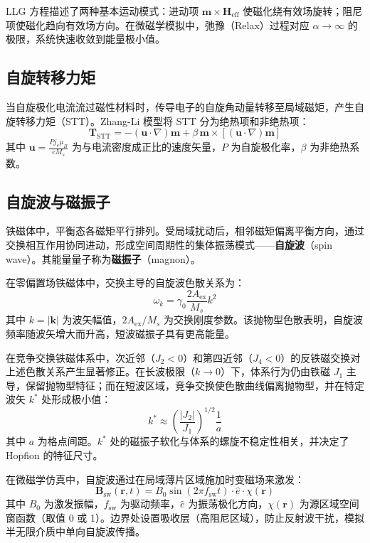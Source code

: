 LLG 方程描述了两种基本运动模式：进动项 $\mathbf{m} \times \mathbf{H}_{\text{eff}}$ 使磁化绕有效场旋转；阻尼项使磁化趋向有效场方向。在微磁学模拟中，弛豫（Relax）过程对应 $\alpha \to \infty$ 的极限，系统快速收敛到能量极小值。

\subsection{自旋转移力矩}

当自旋极化电流流过磁性材料时，传导电子的自旋角动量转移至局域磁矩，产生自旋转移力矩（STT）。Zhang-Li 模型将 STT 分为绝热项和非绝热项：
\begin{equation}
  \mathbf{T}_{\text{STT}} = -(\mathbf{u} \cdot \nabla)\mathbf{m} + \beta \, \mathbf{m} \times [(\mathbf{u} \cdot \nabla)\mathbf{m}]
  \label{eq:stt}
\end{equation}
其中 $\mathbf{u} = \frac{P j_e \mu_B}{e M_s}$ 为与电流密度成正比的速度矢量，$P$ 为自旋极化率，$\beta$ 为非绝热系数。


\subsection{自旋波与磁振子}

铁磁体中，平衡态各磁矩平行排列。受局域扰动后，相邻磁矩偏离平衡方向，通过交换相互作用协同进动，形成空间周期性的集体振荡模式——\textbf{自旋波}（spin wave）。其能量量子称为\textbf{磁振子}（magnon）。

在零偏置场铁磁体中，交换主导的自旋波色散关系为：
\begin{equation}
  \omega_k = \gamma_0 \frac{2A_{\text{ex}}}{M_s} k^2
  \label{eq:sw-dispersion}
\end{equation}
其中 $k = |\mathbf{k}|$ 为波矢幅值，$2A_{\text{ex}}/M_s$ 为交换刚度参数。该抛物型色散表明，自旋波频率随波矢增大而升高，短波磁振子具有更高能量。

在竞争交换铁磁体系中，次近邻（$J_2 < 0$）和第四近邻（$J_4 < 0$）的反铁磁交换对上述色散关系产生显著修正。在长波极限（$k \to 0$）下，体系行为仍由铁磁 $J_1$ 主导，保留抛物型特征；而在短波区域，竞争交换使色散曲线偏离抛物型，并在特定波矢 $k^*$ 处形成极小值：
\begin{equation}
  k^* \approx \left(\frac{|J_2|}{J_1}\right)^{1/2} \frac{1}{a}
  \label{eq:sw-kstar}
\end{equation}
其中 $a$ 为格点间距。$k^*$ 处的磁振子软化与体系的螺旋不稳定性相关，并决定了 Hopfion 的特征尺寸。

在微磁学仿真中，自旋波通过在局域薄片区域施加时变磁场来激发：
\begin{equation}
  \mathbf{B}_{\text{sw}}(\mathbf{r}, t) = B_0 \sin(2\pi f_{\text{sw}} t) \cdot \hat{e} \cdot \chi(\mathbf{r})
  \label{eq:sw-excitation}
\end{equation}
其中 $B_0$ 为激发振幅，$f_{\text{sw}}$ 为驱动频率，$\hat{e}$ 为振荡极化方向，$\chi(\mathbf{r})$ 为源区域空间窗函数（取值 0 或 1）。边界处设置吸收层（高阻尼区域），防止反射波干扰，模拟半无限介质中单向自旋波传播。

